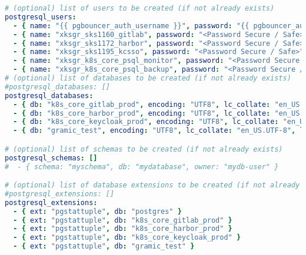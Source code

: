 \begin{flushleft}
\begin{lstlisting}[language=yaml, caption=Testsystem - Anhang - Maintenance - main.yml,captionpos=b,label={lst:testsystem-maintenance-main.yml},breaklines=true]
# (optional) list of users to be created (if not already exists)
postgresql_users:
  - { name: "{{ pgbouncer_auth_username }}", password: "{{ pgbouncer_auth_password }}", flags: "LOGIN", role: "" }
  - { name: "xksgr_sks1160_gitlab", password: "<Password Secure / Safe>", flags: "SUPERUSER" }
  - { name: "xksgr_sks1172_harbor", password: "<Password Secure / Safe>", flags: "SUPERUSER" }
  - { name: "xksgr_sks1195_kcsso", password: "<Password Secure / Safe>", flags: "SUPERUSER" }
  - { name: "xksgr_k8s_core_psql_monitor", password: "<Password Secure / Safe>", flags: "LOGIN", role: "pg_monitor" }
  - { name: "xksgr_k8s_core_psql_backup", password: "<Password Secure / Safe>", flags: "SUPERUSER" }
# (optional) list of databases to be created (if not already exists)
#postgresql_databases: []
postgresql_databases:
  - { db: "k8s_core_gitlab_prod", encoding: "UTF8", lc_collate: "en_US.UTF-8", lc_ctype: "en_US.UTF-8", owner: "xksgr_sks1160_gitlab" }
  - { db: "k8s_core_harbor_prod", encoding: "UTF8", lc_collate: "en_US.UTF-8", lc_ctype: "en_US.UTF-8", owner: "xksgr_sks1172_harbor" }
  - { db: "k8s_core_keycloak_prod", encoding: "UTF8", lc_collate: "en_US.UTF-8", lc_ctype: "en_US.UTF-8", owner: "xksgr_sks1195_kcsso" }
  - { db: "gramic_test", encoding: "UTF8", lc_collate: "en_US.UTF-8", lc_ctype: "en_US.UTF-8", owner: "postgres" }

# (optional) list of schemas to be created (if not already exists)
postgresql_schemas: []
#  - { schema: "myschema", db: "mydatabase", owner: "mydb-user" }

# (optional) list of database extensions to be created (if not already exists)
#postgresql_extensions: []
postgresql_extensions:
  - { ext: "pgstattuple", db: "postgres" }
  - { ext: "pgstattuple", db: "k8s_core_gitlab_prod" }
  - { ext: "pgstattuple", db: "k8s_core_harbor_prod" }
  - { ext: "pgstattuple", db: "k8s_core_keycloak_prod" }
  - { ext: "pgstattuple", db: "gramic_test" }


\end{lstlisting}
\end{flushleft}
